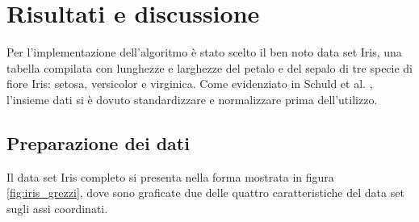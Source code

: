 \chapter{Risultati e discussione}\label{ch:risultati}


Per l'implementazione dell'algoritmo è stato scelto il ben noto 
data set Iris, una tabella compilata con lunghezze e larghezze 
del petalo e del sepalo di tre specie di fiore Iris: 
setosa, versicolor e virginica.  
Come evidenziato in Schuld et al. \cite{schuld}, 
l'insieme dati si è dovuto standardizzare e 
normalizzare prima dell'utilizzo. 




\section{Preparazione dei dati}

Il data set Iris completo si presenta nella forma mostrata in figura 
\ref{fig:iris_grezzi}, dove sono graficate due delle quattro caratteristiche 
del data set sugli assi coordinati. 

